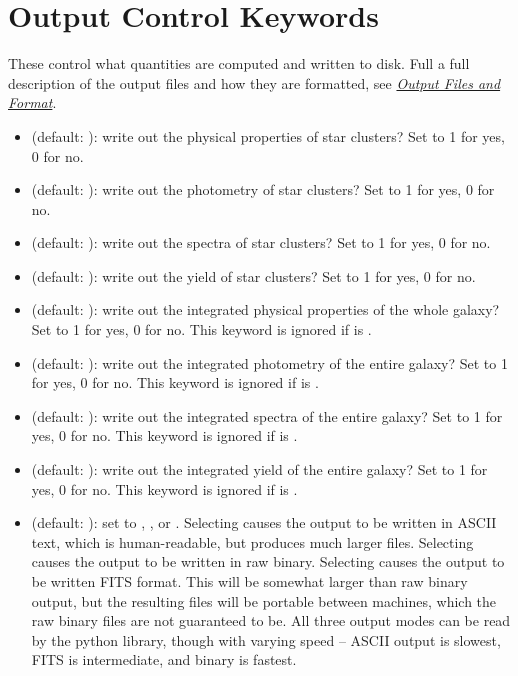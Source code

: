 \documentclass[letterpaper,10pt,english]{sphinxmanual}
\begin{document}
\section{Output Control Keywords}
\label{parameters:output-control-keywords}
These control what quantities are computed and written to disk. Full a full description of the output files and how they are formatted, see {\hyperref[output:sec\string-output]{\emph{Output Files and Format}}}.
\begin{itemize}
\item {} 
 (default: ): write out the physical properties of star clusters? Set to 1 for yes, 0 for no.

\item {} 
 (default: ): write out the photometry of star clusters? Set to 1 for yes, 0 for no.

\item {} 
 (default: ): write out the spectra of star clusters? Set to 1 for yes, 0 for no.

\item {} 
 (default: ): write out the yield of star clusters? Set to 1 for yes, 0 for no.

\item {} 
 (default: ): write out the integrated physical properties of the whole galaxy? Set to 1 for yes, 0 for no. This keyword is ignored if  is .

\item {} 
 (default: ): write out the integrated photometry of the entire galaxy? Set to 1 for yes, 0 for no. This keyword is ignored if  is .

\item {} 
 (default: ): write out the integrated spectra of the entire galaxy? Set to 1 for yes, 0 for no. This keyword is ignored if  is .

\item {} 
 (default: ): write out the integrated yield of the entire galaxy? Set to 1 for yes, 0 for no. This keyword is ignored if  is .

\item {} 
 (default: ): set to , , or . Selecting  causes the output to be written in ASCII text, which is human-readable, but produces much larger files. Selecting  causes the output to be written in raw binary. Selecting  causes the output to be written FITS format. This will be somewhat larger than raw binary output, but the resulting files will be portable between machines, which the raw binary files are not guaranteed to be. All three output modes can be read by the python library, though with varying speed -- ASCII output is slowest, FITS is intermediate, and binary is fastest.

\end{itemize}
\end{document}
